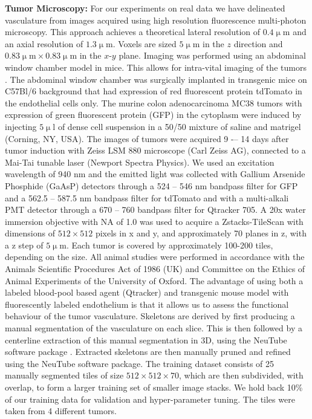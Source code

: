\documentclass[journal,transmag]{IEEEtran}
\begin{document}
\textbf{Tumor Microscopy:} For our experiments on real data we have delineated vasculature from images acquired using high resolution fluorescence multi-photon microscopy. This approach achieves a theoretical lateral resolution of $0.4\upmu\mbox{m}$ and an axial resolution of $1.3\upmu\mbox{m}$. Voxels are sized $5\upmu\mbox{m}$ in the $z$ direction and $0.83 \upmu\mbox{m} \times 0.83 \upmu\mbox{m}$ in the $x$-$y$ plane. Imaging was performed using an abdominal window chamber model in mice. This allows for intra-vital imaging of the tumors \cite{Ritsma2013}. The abdominal window chamber was surgically implanted in transgenic mice on C57Bl/6 background that had expression of red fluorescent protein tdTomato in the endothelial cells only. The murine colon adenocarcinoma MC38 tumors with expression of green fluorescent protein (GFP) in the cytoplasm were induced by injecting $5\upmu\mbox{l}$ of dense cell suspension in a 50/50 mixture of saline and matrigel (Corning, NY, USA). The images of tumors were acquired 9 -– 14 days after tumor induction with Zeiss LSM 880 microscope (Carl Zeiss AG), connected to a Mai-Tai tunable laser (Newport Spectra Physics). We used an excitation wavelength of 940 nm and the emitted light was collected with Gallium Arsenide Phosphide (GaAsP) detectors through a 524 -- 546 nm bandpass filter for GFP and a 562.5 -- 587.5 nm bandpass filter for tdTomato and with a multi-alkali PMT detector through a 670 -- 760 bandpass filter for Qtracker 705. A 20x water immersion objective with NA of 1.0 was used to acquire a Zstacks-TileScan with dimensions of $512 \times 512$ pixels in x and y, and approximately 70 planes in z, with a z step of $5\upmu\mbox{m}$. Each tumor is covered by approximately 100-200 tiles, depending on the size. All animal studies were performed in accordance with the Animals Scientific Procedures Act of 1986 (UK) and Committee on the Ethics of Animal Experiments of the University of Oxford.
The advantage of using both a labeled blood-pool based agent (Qtracker) and transgenic mouse model with fluorescently labeled endothelium is that it allows us to assess the functional behaviour of the tumor vasculature. Skeletons are derived by first producing a manual segmentation of the vasculature on each slice. This is then followed by a centerline extraction of this manual segmentation in 3D, using the NeuTube software package \cite{Feng2015}. Extracted skeletons are then manually pruned and refined using the NeuTube software package. The training dataset consists of 25 manually segmented tiles of size $512 \times 512 \times 70$, which are then subdivided, with overlap, to form a larger training set of smaller image stacks. We hold back 10\% of our training data for validation and hyper-parameter tuning. The tiles were taken from 4 different tumors.
\end{document}
